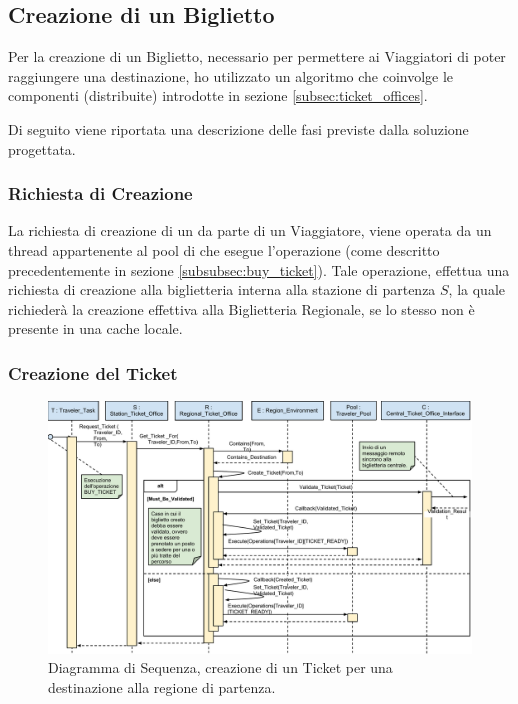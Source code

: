 \newpage
\subsection{Creazione di un Biglietto}

Per la creazione di un Biglietto, necessario per permettere ai Viaggiatori di poter raggiungere una destinazione, ho utilizzato un algoritmo che coinvolge le componenti (distribuite) introdotte in sezione \ref{subsec:ticket_offices}.

Di seguito viene riportata una descrizione delle fasi previste dalla soluzione progettata.

	\subsubsection {Richiesta di Creazione}\label{subsubsec:ticket_creation_request}
	
	La richiesta di creazione di un  da parte di un Viaggiatore, viene operata da un thread appartenente al pool di  che esegue l'operazione  (come descritto precedentemente in sezione \ref{subsubsec:buy_ticket}). Tale operazione, effettua una richiesta di creazione alla biglietteria interna alla stazione di partenza $S$, la quale richiederà la creazione effettiva alla Biglietteria Regionale, se lo stesso  non è presente in una cache locale.  
	
	\subsubsection {Creazione del Ticket} \label{subsubsec:ticket_creation}
	
	\begin{figure}[htbp]
		\includegraphics[trim = 55mm 0mm 0mm 0mm,scale=0.5]{imgs/Buy_Ticket_Sequence_Diagram.pdf}
		\caption{\footnotesize{Diagramma di Sequenza, creazione di un Ticket per una destinazione  alla regione di partenza.}}
		\label{fig:local_ticket_creation_diagram}
	\end{figure}
	
